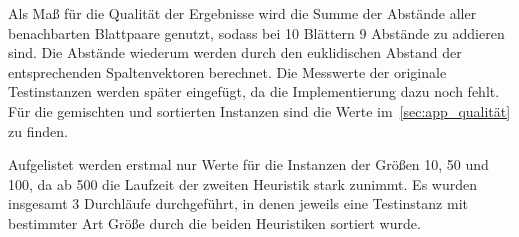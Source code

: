 \documentclass[a4paper, 10pt, twoside, onecolumn, parskip]{scrartcl}
\begin{document}
    Als Maß für die Qualität der Ergebnisse wird die Summe der Abstände aller benachbarten Blattpaare genutzt, sodass bei 10 Blättern 9 Abstände zu addieren sind.
    Die Abstände wiederum werden durch den euklidischen Abstand der entsprechenden Spaltenvektoren berechnet.
    Die Messwerte der originale Testinstanzen werden später eingefügt, da die Implementierung dazu noch fehlt.
    Für die gemischten und sortierten Instanzen sind die Werte im~\autoref{sec:app_qualität} zu finden.

    Aufgelistet werden erstmal nur Werte für die Instanzen der Größen 10, 50 und 100, da ab 500 die Laufzeit der zweiten Heuristik stark zunimmt.
    Es wurden insgesamt 3 Durchläufe durchgeführt, in denen jeweils eine Testinstanz mit bestimmter Art Größe durch die beiden Heuristiken sortiert wurde.



\end{document}
